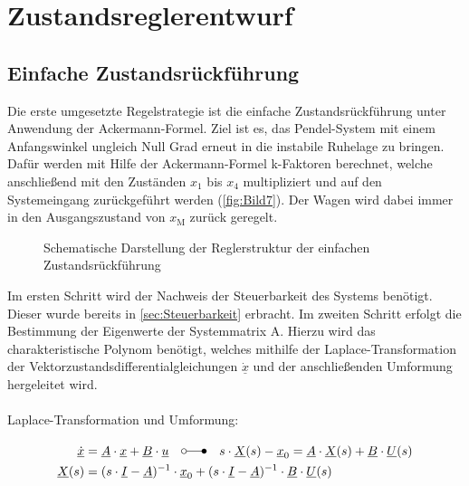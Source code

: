 \section{Zustandsreglerentwurf} \label{sec:Zustandsreglerentwurf}

\subsection{Einfache Zustandsrückführung} \label{sec:Ackermann-Formel}

Die erste umgesetzte Regelstrategie ist die einfache Zustandsrückführung unter Anwendung der Ackermann-Formel. Ziel ist es, das Pendel-System mit einem Anfangswinkel ungleich Null Grad erneut in die instabile Ruhelage zu bringen. Dafür werden mit Hilfe der Ackermann-Formel k-Faktoren berechnet, welche anschließend mit den Zuständen $x_{\mathrm{1}}$ bis $x_{\mathrm{4}}$ multipliziert und auf den Systemeingang zurückgeführt werden (\autoref{fig:Bild7}). Der Wagen wird dabei immer in den Ausgangszustand von $x_{\mathrm{M}}$ zurück geregelt.

\begin{figure}[H]
    \centering
    \caption[Reglerstruktur einfache Zustandsrückführung]{Schematische Darstellung der Reglerstruktur der einfachen Zustandsrückführung}
    \label{fig:Bild7}
\end{figure}

Im ersten Schritt wird der Nachweis der Steuerbarkeit des Systems benötigt. Dieser wurde bereits in \autoref{sec:Steuerbarkeit} erbracht.
Im zweiten Schritt erfolgt die Bestimmung der Eigenwerte der Systemmatrix A. Hierzu wird das charakteristische Polynom benötigt, welches mithilfe der Laplace-Transformation der Vektorzustandsdifferentialgleichungen $\underline{\dot{x}}$ und der anschließenden Umformung hergeleitet wird.\\\\
Laplace-Transformation und Umformung:

\begin{align*}
    \underline{\dot{x}} &= \underline{A}\cdot\underline{x}+\underline{B}\cdot\underline{u}\quad\laplace \quad s\cdot \underline{X}(s)-\underline{x}_{\mathrm{0}}=\underline{A}\cdot \underline{X}(s)+\underline{B}\cdot \underline{U}(s) \\
    \underline{X}(s) &= (s\cdot \underline{I} - \underline{A})^{-1}\cdot\underline{x}_{\mathrm{0}}+(s\cdot \underline{I} - \underline{A})^{-1}\cdot\underline{B}\cdot\underline{U}(s)
\end{align*}

